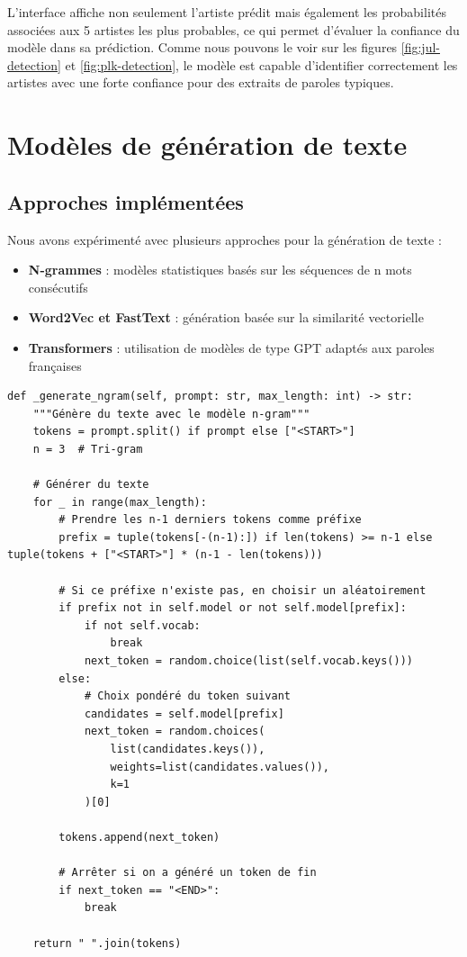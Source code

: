 \documentclass[a4paper,11pt]{article}
\begin{document}
L'interface affiche non seulement l'artiste prédit mais également les probabilités associées aux 5 artistes les plus probables, ce qui permet d'évaluer la confiance du modèle dans sa prédiction. Comme nous pouvons le voir sur les figures \ref{fig:jul-detection} et \ref{fig:plk-detection}, le modèle est capable d'identifier correctement les artistes avec une forte confiance pour des extraits de paroles typiques.

\section{Modèles de génération de texte}
\label{sec:generation}

\subsection{Approches implémentées}
Nous avons expérimenté avec plusieurs approches pour la génération de texte :

\begin{itemize}
    \item \textbf{N-grammes} : modèles statistiques basés sur les séquences de n mots consécutifs
    \item \textbf{Word2Vec et FastText} : génération basée sur la similarité vectorielle
    \item \textbf{Transformers} : utilisation de modèles de type GPT adaptés aux paroles françaises
\end{itemize}

\begin{lstlisting}[caption=Extrait du code de génération]
def _generate_ngram(self, prompt: str, max_length: int) -> str:
    """Génère du texte avec le modèle n-gram"""
    tokens = prompt.split() if prompt else ["<START>"]
    n = 3  # Tri-gram

    # Générer du texte
    for _ in range(max_length):
        # Prendre les n-1 derniers tokens comme préfixe
        prefix = tuple(tokens[-(n-1):]) if len(tokens) >= n-1 else tuple(tokens + ["<START>"] * (n-1 - len(tokens)))
        
        # Si ce préfixe n'existe pas, en choisir un aléatoirement
        if prefix not in self.model or not self.model[prefix]:
            if not self.vocab:
                break
            next_token = random.choice(list(self.vocab.keys()))
        else:
            # Choix pondéré du token suivant
            candidates = self.model[prefix]
            next_token = random.choices(
                list(candidates.keys()),
                weights=list(candidates.values()),
                k=1
            )[0]
        
        tokens.append(next_token)
        
        # Arrêter si on a généré un token de fin
        if next_token == "<END>":
            break
            
    return " ".join(tokens)
\end{lstlisting}
\end{document}
